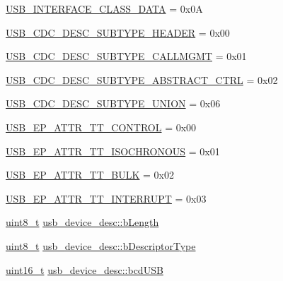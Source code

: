 \begin{DoxyCompactItemize}
\hyperlink{group___p_i_o_s___u_s_b___d_e_f_s_gacf58991b679e8a7c83d8b7fd4de2b0c3}{U\-S\-B\-\_\-\-I\-N\-T\-E\-R\-F\-A\-C\-E\-\_\-\-C\-L\-A\-S\-S\-\_\-\-D\-A\-T\-A} = 0x0\-A
\item 
\hyperlink{group___p_i_o_s___u_s_b___d_e_f_s_gac9115f2ac7d1d17980e46b7ce7a50ea0}{U\-S\-B\-\_\-\-C\-D\-C\-\_\-\-D\-E\-S\-C\-\_\-\-S\-U\-B\-T\-Y\-P\-E\-\_\-\-H\-E\-A\-D\-E\-R} = 0x00
\item 
\hyperlink{group___p_i_o_s___u_s_b___d_e_f_s_ga8d83d4113ad6da600bb1f5c9e59f6701}{U\-S\-B\-\_\-\-C\-D\-C\-\_\-\-D\-E\-S\-C\-\_\-\-S\-U\-B\-T\-Y\-P\-E\-\_\-\-C\-A\-L\-L\-M\-G\-M\-T} = 0x01
\item 
\hyperlink{group___p_i_o_s___u_s_b___d_e_f_s_ga043b00a6c78699ea40980c4e6b6953fe}{U\-S\-B\-\_\-\-C\-D\-C\-\_\-\-D\-E\-S\-C\-\_\-\-S\-U\-B\-T\-Y\-P\-E\-\_\-\-A\-B\-S\-T\-R\-A\-C\-T\-\_\-\-C\-T\-R\-L} = 0x02
\item 
\hyperlink{group___p_i_o_s___u_s_b___d_e_f_s_ga1e82533e12e430b159c6f3991c9f9abc}{U\-S\-B\-\_\-\-C\-D\-C\-\_\-\-D\-E\-S\-C\-\_\-\-S\-U\-B\-T\-Y\-P\-E\-\_\-\-U\-N\-I\-O\-N} = 0x06
\item 
\hyperlink{group___p_i_o_s___u_s_b___d_e_f_s_ga070156f09d8bdc57ba3bda2bf9f3d094}{U\-S\-B\-\_\-\-E\-P\-\_\-\-A\-T\-T\-R\-\_\-\-T\-T\-\_\-\-C\-O\-N\-T\-R\-O\-L} = 0x00
\item 
\hyperlink{group___p_i_o_s___u_s_b___d_e_f_s_ga3c73315ff55c81c383cf543def2ea98f}{U\-S\-B\-\_\-\-E\-P\-\_\-\-A\-T\-T\-R\-\_\-\-T\-T\-\_\-\-I\-S\-O\-C\-H\-R\-O\-N\-O\-U\-S} = 0x01
\item 
\hyperlink{group___p_i_o_s___u_s_b___d_e_f_s_gafaccb056cfc2641b997193afe0cad5b0}{U\-S\-B\-\_\-\-E\-P\-\_\-\-A\-T\-T\-R\-\_\-\-T\-T\-\_\-\-B\-U\-L\-K} = 0x02
\item 
\hyperlink{group___p_i_o_s___u_s_b___d_e_f_s_ga4708a7eac40380fbc1d641c9d631a06e}{U\-S\-B\-\_\-\-E\-P\-\_\-\-A\-T\-T\-R\-\_\-\-T\-T\-\_\-\-I\-N\-T\-E\-R\-R\-U\-P\-T} = 0x03
\item 
\hyperlink{stdint_8h_aba7bc1797add20fe3efdf37ced1182c5}{uint8\-\_\-t} \hyperlink{group___p_i_o_s___u_s_b___d_e_f_s_gae982ead8e11c6f9bd465132001f83c11}{usb\-\_\-device\-\_\-desc\-::b\-Length}
\item 
\hyperlink{stdint_8h_aba7bc1797add20fe3efdf37ced1182c5}{uint8\-\_\-t} \hyperlink{group___p_i_o_s___u_s_b___d_e_f_s_gaa704e180aaabca3aa213472f102bd91e}{usb\-\_\-device\-\_\-desc\-::b\-Descriptor\-Type}
\item 
\hyperlink{stdint_8h_a273cf69d639a59973b6019625df33e30}{uint16\-\_\-t} \hyperlink{group___p_i_o_s___u_s_b___d_e_f_s_ga9f1c1b7e10dd6118532befba9204375c}{usb\-\_\-device\-\_\-desc\-::bcd\-U\-S\-B}

\end{DoxyCompactItemize}
